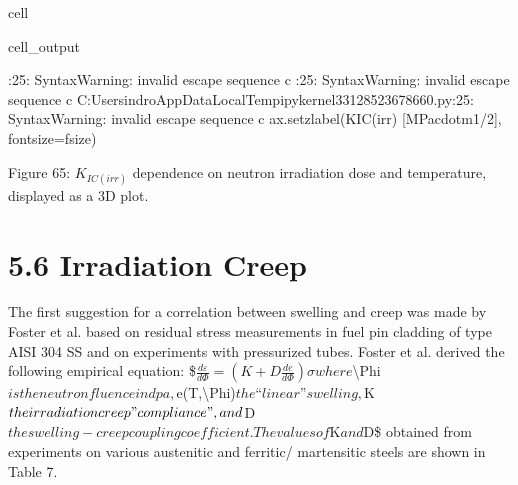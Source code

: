 \documentclass[letterpaper,10pt,english]{jupyterBook}
\begin{document}
\begin{sphinxuseclass}{cell}
\begin{sphinxVerbatimOutput}
			\begin{sphinxuseclass}{cell_output}
				\begin{sphinxVerbatim}[commandchars=\\\{\}]
					\PYGZlt{}\PYGZgt{}:25: SyntaxWarning: invalid escape sequence \PYGZsq{}\PYGZbs{}c\PYGZsq{}
					\PYGZlt{}\PYGZgt{}:25: SyntaxWarning: invalid escape sequence \PYGZsq{}\PYGZbs{}c\PYGZsq{}
					C:\PYGZbs{}Users\PYGZbs{}indro\PYGZbs{}AppData\PYGZbs{}Local\PYGZbs{}Temp\PYGZbs{}ipykernel\PYGZus{}33128\PYGZbs{}523678660.py:25: SyntaxWarning: invalid escape sequence \PYGZsq{}\PYGZbs{}c\PYGZsq{}
					ax.set\PYGZus{}zlabel(\PYGZsq{}\PYGZdl{}K\PYGZus{}\PYGZob{}IC(irr)\PYGZcb{}\PYGZdl{} [MPa\PYGZdl{}\PYGZbs{}cdot\PYGZdl{}m\PYGZdl{}\PYGZca{}\PYGZob{}1/2\PYGZcb{}\PYGZdl{}]\PYGZsq{}, fontsize=f\PYGZus{}size)
				\end{sphinxVerbatim}
				
				\noindent{}
				
		\end{sphinxuseclass}\end{sphinxVerbatimOutput}
		
	\end{sphinxuseclass}
	\sphinxAtStartPar
	Figure 65: \(K_{IC(irr)}\) dependence on neutron irradiation dose and temperature, displayed as a 3D plot.
	
	
	\section{5.6 Irradiation Creep}
	\label{\detokenize{5 Radiation Effects on Mechanical Properties:irradiation-creep}}
	\sphinxAtStartPar
	The first suggestion for a correlation between swelling and creep was made by Foster et al. based on residual stress measurements in fuel pin cladding of type AISI 304 SS and on experiments with pressurized tubes. Foster et al. derived the following empirical equation:
	\$\( \frac{d\varepsilon}{d\Phi}=(K+D\frac{de}{d\Phi})\sigma \)\(
	where \)\textbackslash{}Phi\( is the neutron fluence in dpa, \)e(T,\textbackslash{}Phi)\( the “linear” swelling, \)K\( the irradiation creep "compliance", and \)D\( the swelling-creep coupling coefficient. The values of \)K\( and \)D\$ obtained from experiments on various austenitic and ferritic/ martensitic steels are shown in Table 7.
	
\end{document}
